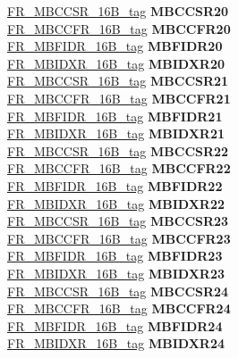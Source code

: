 \begin{DoxyCompactItemize}
\begin{tabbing}
\>\>\mbox{\hyperlink{unionFR__MBCCSR__16B__tag}{FR\_MBCCSR\_16B\_tag}} {\bfseries MBCCSR20}\\
\>\>\mbox{\hyperlink{unionFR__MBCCFR__16B__tag}{FR\_MBCCFR\_16B\_tag}} {\bfseries MBCCFR20}\\
\>\>\mbox{\hyperlink{unionFR__MBFIDR__16B__tag}{FR\_MBFIDR\_16B\_tag}} {\bfseries MBFIDR20}\\
\>\>\mbox{\hyperlink{unionFR__MBIDXR__16B__tag}{FR\_MBIDXR\_16B\_tag}} {\bfseries MBIDXR20}\\
\>\>\mbox{\hyperlink{unionFR__MBCCSR__16B__tag}{FR\_MBCCSR\_16B\_tag}} {\bfseries MBCCSR21}\\
\>\>\mbox{\hyperlink{unionFR__MBCCFR__16B__tag}{FR\_MBCCFR\_16B\_tag}} {\bfseries MBCCFR21}\\
\>\>\mbox{\hyperlink{unionFR__MBFIDR__16B__tag}{FR\_MBFIDR\_16B\_tag}} {\bfseries MBFIDR21}\\
\>\>\mbox{\hyperlink{unionFR__MBIDXR__16B__tag}{FR\_MBIDXR\_16B\_tag}} {\bfseries MBIDXR21}\\
\>\>\mbox{\hyperlink{unionFR__MBCCSR__16B__tag}{FR\_MBCCSR\_16B\_tag}} {\bfseries MBCCSR22}\\
\>\>\mbox{\hyperlink{unionFR__MBCCFR__16B__tag}{FR\_MBCCFR\_16B\_tag}} {\bfseries MBCCFR22}\\
\>\>\mbox{\hyperlink{unionFR__MBFIDR__16B__tag}{FR\_MBFIDR\_16B\_tag}} {\bfseries MBFIDR22}\\
\>\>\mbox{\hyperlink{unionFR__MBIDXR__16B__tag}{FR\_MBIDXR\_16B\_tag}} {\bfseries MBIDXR22}\\
\>\>\mbox{\hyperlink{unionFR__MBCCSR__16B__tag}{FR\_MBCCSR\_16B\_tag}} {\bfseries MBCCSR23}\\
\>\>\mbox{\hyperlink{unionFR__MBCCFR__16B__tag}{FR\_MBCCFR\_16B\_tag}} {\bfseries MBCCFR23}\\
\>\>\mbox{\hyperlink{unionFR__MBFIDR__16B__tag}{FR\_MBFIDR\_16B\_tag}} {\bfseries MBFIDR23}\\
\>\>\mbox{\hyperlink{unionFR__MBIDXR__16B__tag}{FR\_MBIDXR\_16B\_tag}} {\bfseries MBIDXR23}\\
\>\>\mbox{\hyperlink{unionFR__MBCCSR__16B__tag}{FR\_MBCCSR\_16B\_tag}} {\bfseries MBCCSR24}\\
\>\>\mbox{\hyperlink{unionFR__MBCCFR__16B__tag}{FR\_MBCCFR\_16B\_tag}} {\bfseries MBCCFR24}\\
\>\>\mbox{\hyperlink{unionFR__MBFIDR__16B__tag}{FR\_MBFIDR\_16B\_tag}} {\bfseries MBFIDR24}\\
\>\>\mbox{\hyperlink{unionFR__MBIDXR__16B__tag}{FR\_MBIDXR\_16B\_tag}} {\bfseries MBIDXR24}\\

\end{tabbing}
\end{DoxyCompactItemize}

